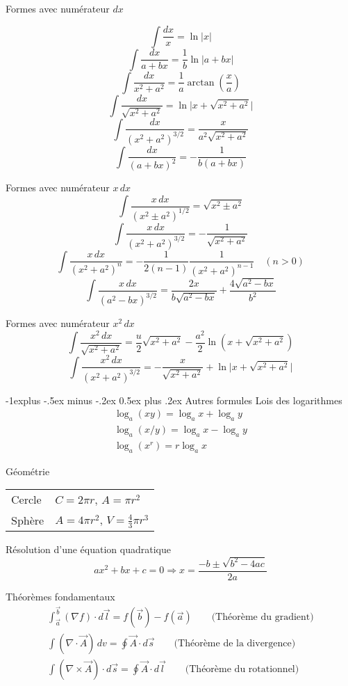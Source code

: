 \documentclass[10pt,landscape]{article}
\makeatletter
\renewcommand{\subsection}{\@startsection{subsection}{2}{0mm}%
                                {-1explus -.5ex minus -.2ex}%
                                {0.5ex plus .2ex}%
                                {\normalfont\normalsize\bfseries}}
\newcommand{\extraline}{\vspace{1em}}
\newcommand{\halfline}{\vspace{0.5em}}
\newcommand{\tableindent}{\hspace{1.5em}}
\makeatother
\begin{document}
\begin{multicols}{3}
%
Formes avec numérateur $dx$
\begin{multicols}{2}
\noindent
\[ \int \frac{dx}{x} = \ln \lvert x \rvert \]
\[ \int \frac{dx}{a+bx} = \frac{1}{b}\ln\lvert a+bx\rvert \]
\[ \int \frac{dx}{x^2+a^2} = \frac{1}{a}\arctan\left(\frac{x}{a}\right) \]
\[\int \frac{dx}{\sqrt{x^2+a^2}} = \ln \lvert x + \sqrt{x^2+a^2} \rvert \]
\[ \int \frac{dx}{(x^2+a^2)^{3/2}} = \frac{x}{a^2\sqrt{x^2+a^2}} \]
\[ \int \frac{dx}{(a+bx)^2} = -\frac{1}{b(a+bx)} \]
\end{multicols}
%


\extraline
Formes avec numérateur $x\,dx$
\[ \int \frac{x\,dx}{(x^2 \pm a^2)^{1/2}} = \sqrt{x^2 \pm a^2} \]
\[\int \frac{x\,dx}{(x^2+a^2)^{3/2}} = -\frac{1}{\sqrt{x^2+a^2}} \]
\[ \int \frac{x\,dx}{(x^2+a^2)^n} = -\frac{1}{2(n-1)} \frac{1}{(x^2+a^2)^{n-1}} \quad (n>0)  \]
\[ \int \frac{x\,dx}{(a^2-bx)^{3/2}} = \frac{2x}{b\sqrt{a^2-bx}} + \frac{4\sqrt{a^2-bx}}{b^2} \]

Formes avec numérateur $x^2\,dx$
\[ \int \frac{x^2\,dx}{\sqrt{x^2+a^2}} =  \frac{u}{2}\sqrt{x^2+a^2} - \frac{a^2}{2}\ln(x+\sqrt{x^2+a^2}) \]
%
\[ \int \frac{x^2\,dx}{(x^2+a^2)^{3/2}} = -\frac{x}{\sqrt{x^2+a^2}} + \ln \lvert x + \sqrt{x^2+a^2} \rvert \]


\subsection{Autres formules}
Lois des logarithmes
\begin{gather*}
\log_a (xy) = \log_a x + \log_a y \\
 \log_a (x/y) = \log_a x - \log_a y \\
\log_a (x^r) = r\log_a x
\end{gather*}

Géométrie \\
\halfline
\begin{tabular}{@{\tableindent}ll@{}}
	Cercle & $C = 2\pi r $, $A =\pi r^2$ \\
	Sphère & $A = 4\pi r^2$, $V = \frac{4}{3}\pi r^3 $ \\
\end{tabular}
\extraline

Résolution d'une équation quadratique
\[ ax^2 + bx + c = 0 \Longrightarrow x = \frac{-b \pm \sqrt{b^2-4ac} }{2a} \]

Théorèmes fondamentaux
\begin{gather*}
\int_{\vec{a}}^{\vec{b}} (\nabla f)\cdot d\vec{l} = f(\vec{b}) - f(\vec{a}) 
\qquad\text{(Théorème du gradient)} \\
\int (\nabla \cdot \vec{A}) \, dv = \oint \vec{A}\cdot d\vec{s}
\qquad\text{(Théorème de la divergence)} \\
\int (\nabla\times\vec{A})\cdot d\vec{s} = \oint \vec{A}\cdot d\vec{l}
\qquad\text{(Théorème du rotationnel)}
\end{gather*}







\end{multicols}
\end{document}
